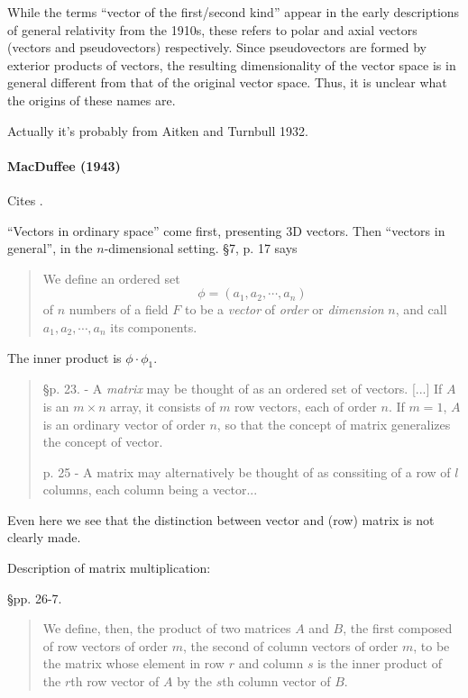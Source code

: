 While the terms ``vector of the first/second kind'' appear in the early descriptions
of general relativity from the 1910s, these refers to polar and axial vectors
(vectors and pseudovectors) respectively. Since pseudovectors are formed by
exterior products of vectors, the resulting dimensionality of the vector space
is in general different from that of the original vector space.
Thus, it is unclear what the origins of these names are.

Actually it's probably from Aitken and Turnbull 1932.


\paragraph{MacDuffee (1943)~\cite{MacDuffee1943}}

Cites \cite{Wedderburn1934}.


``Vectors in ordinary space'' come first, presenting 3D vectors. Then ``vectors
in general'', in the $n$-dimensional setting. \S 7, p. 17 says

\begin{quote}
    We define an ordered set
    \[
        \phi = (a_1, a_2, \cdots, a_n)
    \]
    of $n$ numbers of a field $F$ to be a \textit{vector} of \textit{order} or
    \textit{dimension} $n$, and call $a_1, a_2, \cdots, a_n$ its components.
\end{quote}

The inner product is $\phi\cdot\phi_1$.

\begin{quote}
\S p. 23. - A \textit{matrix} may be thought of as an ordered set of vectors. [...]
If $A$ is an $m\times n$ array, it consists of $m$ row vectors, each of order $n$.
If $m=1$, $A$ is an ordinary vector of order $n$, so that the concept of matrix
generalizes the concept of vector.

p. 25 - A matrix may alternatively be thought of as conssiting of a row of $l$
columns, each column being a vector...
\end{quote}

Even here we see that the distinction between vector and (row) matrix is not
clearly made.

Description of matrix multiplication:

\S pp. 26-7.
\begin{quote}
    We define, then, the product of two matrices $A$ and $B$, the first composed of
    row vectors of order $m$, the second of column vectors of order $m$, to be the
    matrix whose element in row $r$ and column $s$ is the inner product of the $r$th
    row vector of $A$ by the $s$th column vector of $B$.
\end{quote}

